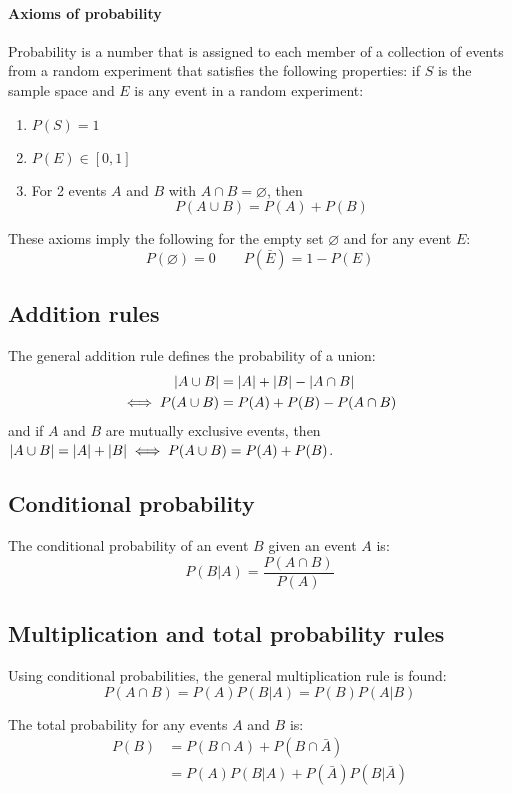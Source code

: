 \documentclass[10pt, twocolumn]{article}
\begin{document}
\paragraph{Axioms of probability}
Probability is a number that is assigned to each member of a collection of events from a random experiment that satisfies the following properties: if \(S\) is the sample space and \(E\) is any event in a random experiment:
\begin{enumerate}
  \item \(P(S) = 1\)
  \item \(P(E) \in [0,1]\)
  \item For 2 events \(A\) and \(B\) with \(A \cap B = \varnothing\), then
        \[
          P(A \cup B) = P(A) + P(B)
        \]
\end{enumerate}

These axioms imply the following for the empty set \(\varnothing\) and for any event \(E\):
\[
  P(\varnothing) = 0 \qquad P(\bar{E}) = 1 - P(E)
\]


\subsection{Addition rules}
The general addition rule defines the probability of a union:
\begin{align*}
  \left| A \cup B \right|   & = \left| A \right| + \left| B \right| - \left| A \cap B \right| \\
  \iff P(A \cup B) & = P(A) + P(B) - P(A \cap B)
\end{align*}
and if \(A\) and \(B\) are mutually exclusive events, then \(\left| A \cup B \right| = \left| A \right| + \left| B \right| \iff P(A \cup B) = P(A) + P(B)\).


\subsection{Conditional probability}
The conditional probability of an event \(B\) given an event \(A\) is:
\[
  P(B|A) = \frac{P(A \cap B)}{P(A)}
\]


\subsection{Multiplication and total probability rules}
Using conditional probabilities, the general multiplication rule is found:
\[
  P(A \cap B) = P(A) P(B|A) = P(B) P(A|B)
\]

The total probability for any events \(A\) and \(B\) is:
\begin{align*}
  P(B) & = P(B \cap A) + P(B \cap \bar{A})       \\
       & = P(A) P(B|A) + P(\bar{A}) P(B|\bar{A}) \\
\end{align*}
\end{document}
